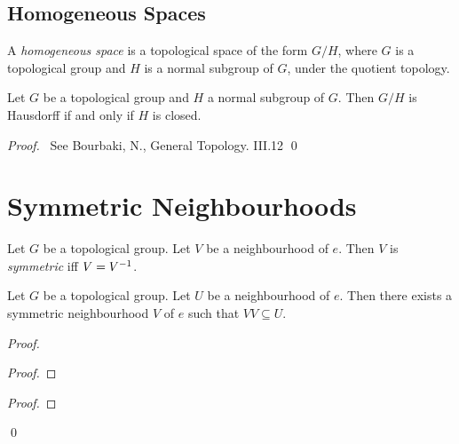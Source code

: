 \subsection{Homogeneous Spaces}

\begin{df}
A \emph{homogeneous space} is a topological space of the form $G/H$, where $G$ is a topological group and $H$ is a normal subgroup of $G$, under the quotient topology.
\end{df}

\begin{prop}
Let $G$ be a topological group and $H$ a normal subgroup of $G$. Then $G/H$ is Hausdorff if and only if $H$ is closed.
\end{prop}

\begin{proof}
\pf\ See Bourbaki, N., General Topology. III.12 \qed
\end{proof}

\section{Symmetric Neighbourhoods}

\begin{df}
Let $G$ be a topological group. Let $V$ be a neighbourhood of $e$. Then $V$ is \emph{symmetric} iff $V = {V}^{-1}$.
\end{df}

\begin{prop}
Let $G$ be a topological group. Let $U$ be a neighbourhood of $e$. Then there exists a symmetric neighbourhood $V$ of $e$ such that $VV \subseteq U$.
\end{prop}

\begin{proof}
\pf
{}
\begin{proof}
\end{proof}
\begin{proof}
\end{proof}
\qed
\end{proof}

